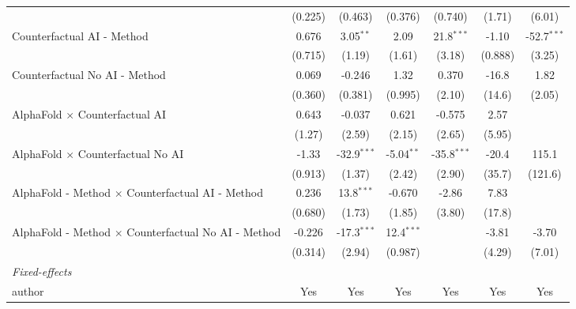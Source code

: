 \begin{tabular}{lcccccc}
                                                              & (0.225)      & (0.463)       & (0.376)      & (0.740)       & (1.71)        & (6.01)\\   
   Counterfactual AI - Method                                 & 0.676        & 3.05$^{**}$   & 2.09         & 21.8$^{***}$  & -1.10         & -52.7$^{***}$\\   
                                                              & (0.715)      & (1.19)        & (1.61)       & (3.18)        & (0.888)       & (3.25)\\   
   Counterfactual No AI - Method                              & 0.069        & -0.246        & 1.32         & 0.370         & -16.8         & 1.82\\   
                                                              & (0.360)      & (0.381)       & (0.995)      & (2.10)        & (14.6)        & (2.05)\\   
   AlphaFold $\times$ Counterfactual AI                       & 0.643        & -0.037        & 0.621        & -0.575        & 2.57          &   \\   
                                                              & (1.27)       & (2.59)        & (2.15)       & (2.65)        & (5.95)        &   \\   
   AlphaFold $\times$ Counterfactual No AI                    & -1.33        & -32.9$^{***}$ & -5.04$^{**}$ & -35.8$^{***}$ & -20.4         & 115.1\\   
                                                              & (0.913)      & (1.37)        & (2.42)       & (2.90)        & (35.7)        & (121.6)\\   
   AlphaFold - Method $\times$ Counterfactual AI - Method     & 0.236        & 13.8$^{***}$  & -0.670       & -2.86         & 7.83          &   \\   
                                                              & (0.680)      & (1.73)        & (1.85)       & (3.80)        & (17.8)        &   \\   
   AlphaFold - Method $\times$ Counterfactual No AI - Method  & -0.226       & -17.3$^{***}$ & 12.4$^{***}$ &               & -3.81         & -3.70\\   
                                                              & (0.314)      & (2.94)        & (0.987)      &               & (4.29)        & (7.01)\\   
   \midrule
   \emph{Fixed-effects}\\
   author                                                     & Yes          & Yes           & Yes          & Yes           & Yes           & Yes\\  

\end{tabular}
